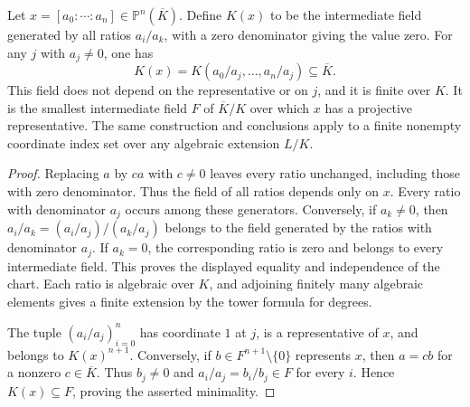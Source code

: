 \begin{definition}
\label{def:projective-field-of-definition}
\leanok
Let $x=[a_0:\cdots:a_n]\in\mathbb P^n(\overline K)$. Define
$K(x)$ to be the intermediate field generated by all ratios
$a_i/a_k$, with a zero denominator giving the value zero.
For any $j$ with $a_j\ne0$, one has
\[
 K(x)=K(a_0/a_j,\ldots,a_n/a_j)\subseteq\overline K.
\]
This field does not depend on the representative or on $j$, and
it is finite over $K$. It is the smallest intermediate field $F$
of $\overline K/K$ over which $x$ has a projective representative.
The same construction and conclusions apply to a finite nonempty
coordinate index set over any algebraic extension $L/K$.
\end{definition}
\begin{proof}
Replacing $a$ by $ca$ with $c\ne0$ leaves every ratio unchanged,
including those with zero denominator. Thus the field of all ratios
depends only on $x$. Every ratio with denominator $a_j$ occurs
among these generators. Conversely, if $a_k\ne0$, then
$a_i/a_k=(a_i/a_j)/(a_k/a_j)$ belongs to the field generated by
the ratios with denominator $a_j$. If $a_k=0$, the corresponding
ratio is zero and belongs to every intermediate field. This proves
the displayed equality and independence of the chart.
Each ratio is algebraic over $K$, and adjoining finitely many
algebraic elements gives a finite extension by the tower formula
for degrees.

The tuple $(a_i/a_j)_{i=0}^n$ has coordinate $1$ at $j$, is a
representative of $x$, and belongs to $K(x)^{n+1}$. Conversely,
if $b\in F^{n+1}\setminus\{0\}$ represents $x$, then $a=cb$
for a nonzero $c\in\overline K$. Thus $b_j\ne0$ and
$a_i/a_j=b_i/b_j\in F$ for every $i$. Hence $K(x)\subseteq F$,
proving the asserted minimality.
\end{proof}

